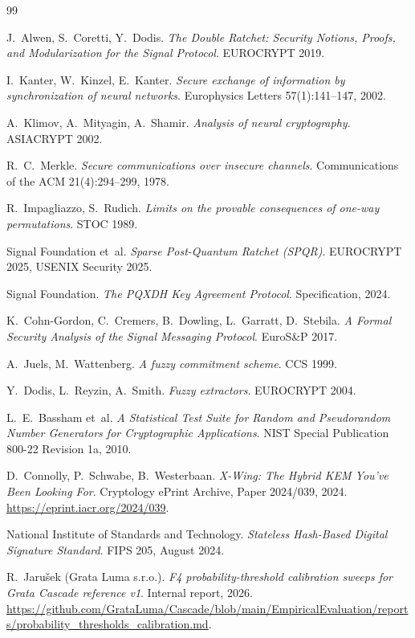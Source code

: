\documentclass[11pt,a4paper]{article}
\begin{document}
\bigskip


\begin{thebibliography}{99}

 J.~Alwen, S.~Coretti, Y.~Dodis. \emph{The Double Ratchet: Security Notions, Proofs, and Modularization for the Signal Protocol}. EUROCRYPT 2019.

 I.~Kanter, W.~Kinzel, E.~Kanter. \emph{Secure exchange of information by synchronization of neural networks}. Europhysics Letters 57(1):141--147, 2002.

 A.~Klimov, A.~Mityagin, A.~Shamir. \emph{Analysis of neural cryptography}. ASIACRYPT 2002.

 R.~C.~Merkle. \emph{Secure communications over insecure channels}. Communications of the ACM 21(4):294--299, 1978.

 R.~Impagliazzo, S.~Rudich. \emph{Limits on the provable consequences of one-way permutations}. STOC 1989.

 Signal Foundation et~al. \emph{Sparse Post-Quantum Ratchet (SPQR)}. EUROCRYPT 2025, USENIX Security 2025.

 Signal Foundation. \emph{The PQXDH Key Agreement Protocol}. Specification, 2024.

 K.~Cohn-Gordon, C.~Cremers, B.~Dowling, L.~Garratt, D.~Stebila. \emph{A Formal Security Analysis of the Signal Messaging Protocol}. EuroS\&P 2017.

 A.~Juels, M.~Wattenberg. \emph{A fuzzy commitment scheme}. CCS 1999.

 Y.~Dodis, L.~Reyzin, A.~Smith. \emph{Fuzzy extractors}. EUROCRYPT 2004.

 L.~E.~Bassham et~al. \emph{A Statistical Test Suite for Random and Pseudorandom Number Generators for Cryptographic Applications}. NIST Special Publication 800-22 Revision 1a, 2010.

 D.~Connolly, P.~Schwabe, B.~Westerbaan. \emph{X-Wing: The Hybrid KEM You've Been Looking For}. Cryptology ePrint Archive, Paper 2024/039, 2024. \url{https://eprint.iacr.org/2024/039}.

 National Institute of Standards and Technology. \emph{Stateless Hash-Based Digital Signature Standard}. FIPS 205, August 2024.

 R.~Jaru\v{s}ek (Grata Luma s.r.o.). \emph{F4 probability-threshold calibration sweeps for Grata Cascade reference v1}. Internal report, 2026. \url{https://github.com/GrataLuma/Cascade/blob/main/EmpiricalEvaluation/reports/probability_thresholds_calibration.md}.

\end{thebibliography}
\end{document}
